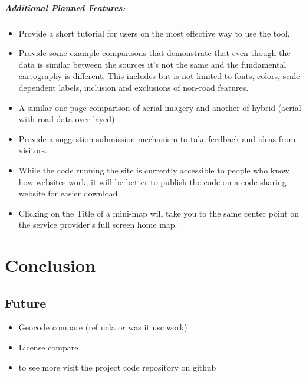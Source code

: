 \documentclass[12pt,letterpaper]{article}
\begin{document}
\subparagraph{Additional Planned Features:}
\begin{itemize}
	\item Provide a short tutorial for users on the most effective way to use the tool.
	\item Provide some example comparisons that demonstrate that even though the data is similar between the sources it's not the same and the fundamental cartography is different. This includes but is not limited to fonts, colors, scale dependent labels, inclusion and exclusions of non-road features.
	\item A similar one page comparison of aerial imagery and another of hybrid (aerial with road data over-layed).
	\item Provide a suggestion submission mechanism to take feedback and ideas from visitors.
	\item While the code running the site is currently accessible to people who know how websites work, it will be better to publish the code on a code sharing website for easier download.
	\item Clicking on the Title of a mini-map will take you to the same center point on the service provider's full screen home map.
\end{itemize}



\section{Conclusion}
\subsection{Future}
\begin{itemize}
	\item Geocode compare (ref ucla or was it usc work)
	\item License compare
	\item to see more visit the project code repository on github
\end{itemize}

\printbibliography[heading=bibliography]
\end{document}
